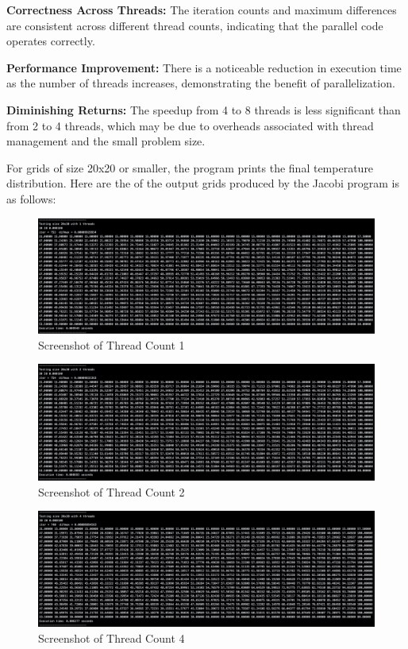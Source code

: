 \documentclass{article}
\begin{document}
\textbf{Correctness Across Threads:} The iteration counts and maximum differences are consistent across different thread counts, indicating that the parallel code operates correctly.

\textbf{Performance Improvement:} There is a noticeable reduction in execution time as the number of threads increases, demonstrating the benefit of parallelization.

\textbf{Diminishing Returns:} The speedup from 4 to 8 threads is less significant than from 2 to 4 threads, which may be due to overheads associated with thread management and the small problem size.

For grids of size 20x20 or smaller, the program prints the final temperature distribution. Here are the of the output grids produced by the Jacobi program is as follows:

\begin{figure}[H]
    \centering
    \includegraphics[width=\linewidth]{Images/Thread1.png}
    \caption{Screenshot of Thread Count 1}
    \label{fig:thread1}
\end{figure}

\begin{figure}[H]
    \centering
    \includegraphics[width=\linewidth]{Images/Thread2.png}
    \caption{Screenshot of Thread Count 2}
    \label{fig:thread2}
\end{figure}

\begin{figure}[H]
    \centering
    \includegraphics[width=\linewidth]{Images/Thread4.png}
    \caption{Screenshot of Thread Count 4}
    \label{fig:thread4}
\end{figure}
\end{document}

